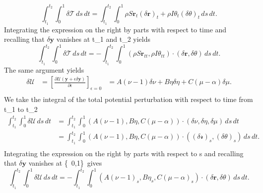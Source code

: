 \documentclass[12pt]{article}
\begin{document}
\[\int_{t_1}^{t_2} \int_{0}^{1} \delta \mathcal{T}\, ds \, dt = \int_{t_1}^{t_2} \int_{0}^{1} \rho S\mathbf{r}_t (\delta\mathbf{r})_t + \rho I \theta_t (\delta \theta)_t\, ds \, dt.
\]
Integrating the expression on the right by parts with respect to time and recalling that $\delta\mathbf{y}$ vanishes at t_1 and t_2  yields
\[\int_{t_1}^{t_2}\int_{0}^{1}\delta \mathcal{T}\,ds\,dt = -\int_{t_1}^{t_2}\int_{0}^{1}(\rho S\mathbf{r}_{tt}, \rho I\theta_{tt})\cdot(\delta\mathbf{r},\delta\theta)\,ds\,dt.
\]
The same argument yields
\begin{equation}
\begin{split}

 \delta\mathcal{U}& = \left[ \frac{\partial \mathcal{U}(\mathbf{y} + \epsilon\delta\mathbf{y})}{\partial{\epsilon}} \right]_{\epsilon=0}
                  & = A(\nu - 1)\delta\nu+ B\eta\delta\eta+C(\mu-\alpha)\delta\mu.\\
\end{split}
\end{equation}
We take the integral of the total potential perturbation with respect to time from t_1 to t_2
\begin{equation}
\begin{split}
\int_{t_1}^{t_2}\int_{0}^{1}\delta\mathcal{U}\,ds\,dt 
                  & = \int_{t_1}^{t_2} \int_{0}^{1} 
(A(\nu-1),B\eta,C(\mu-\alpha))\cdot(\delta\nu,\delta\eta,\delta\mu)\,ds\,dt\\
                  & = \int_{t_1}^{t_2} \int_{0}^{1} 
(A(\nu-1),B\eta, C(\mu-\alpha))\cdot((\delta \mathcal{r})_s,(\delta\theta)_s)\,ds\,dt.\\
\end{split}
\end{equation}
Integrating the expression on the right by parts with respect to s and recalling that $\delta\mathbf{y}$ vanishes at \{\ 0,1\}\ gives
\[\int_{t_1}^{t_2}\int_{0}^{1}\delta\mathcal{U}\,ds\,dt =
-\int_{t_1}^{t_2} \int_{0}^{1} 
(A(\nu-1)_s, B\eta_s, C(\mu-\alpha)_s)\cdot(\delta\mathbf{r},\delta\theta)\,ds\,dt.
\]
\end{document}
